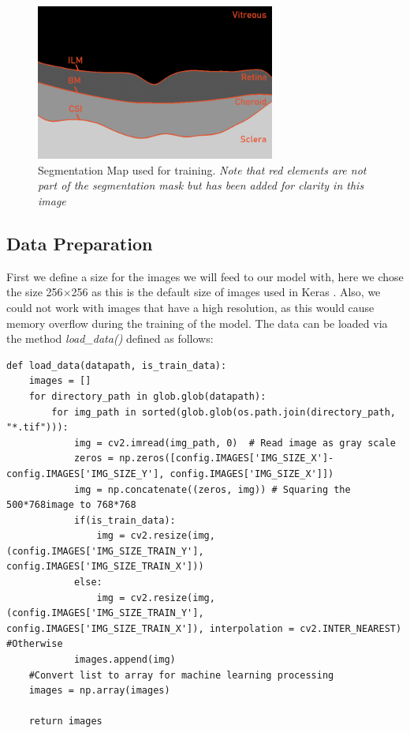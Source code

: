 \documentclass[12pt,a4paper]{scrartcl}
\begin{document}
\begin{figure}[H]
    \centering
    \includegraphics[width=0.7\textwidth]{./images/chun_w00_fix_14_segmented_annotated.png}
    \caption{Segmentation Map used for training. \emph{Note that red elements are not part of the segmentation mask but has been added for clarity in this image}}
    \label{fig:annotated-layers}
\end{figure}

\subsection{Data Preparation}\label{ss:datapreparation}
First we define a size for the images we will feed to our model with, here we chose the size 256$\times$256 as this is the default size of images used in Keras \cite{chollet2015keras}. Also, we could not work with images that have a high resolution, as this would cause memory overflow during the training of the model. The data can be loaded via the method \emph{load\_data()} defined as follows:
\begin{lstlisting}[caption=The method for loading data can be found in the \emph{helper.py} file]
def load_data(datapath, is_train_data):
    images = []
    for directory_path in glob.glob(datapath):
        for img_path in sorted(glob.glob(os.path.join(directory_path, "*.tif"))):
            img = cv2.imread(img_path, 0)  # Read image as gray scale  
            zeros = np.zeros([config.IMAGES['IMG_SIZE_X']-config.IMAGES['IMG_SIZE_Y'], config.IMAGES['IMG_SIZE_X']]) 
            img = np.concatenate((zeros, img)) # Squaring the 500*768image to 768*768
            if(is_train_data):
                img = cv2.resize(img, (config.IMAGES['IMG_SIZE_TRAIN_Y'], config.IMAGES['IMG_SIZE_TRAIN_X']))
            else:
                img = cv2.resize(img, (config.IMAGES['IMG_SIZE_TRAIN_Y'], config.IMAGES['IMG_SIZE_TRAIN_X']), interpolation = cv2.INTER_NEAREST)  #Otherwise 
            images.append(img)
    #Convert list to array for machine learning processing        
    images = np.array(images)
    
    return images
\end{lstlisting}
\end{document}
